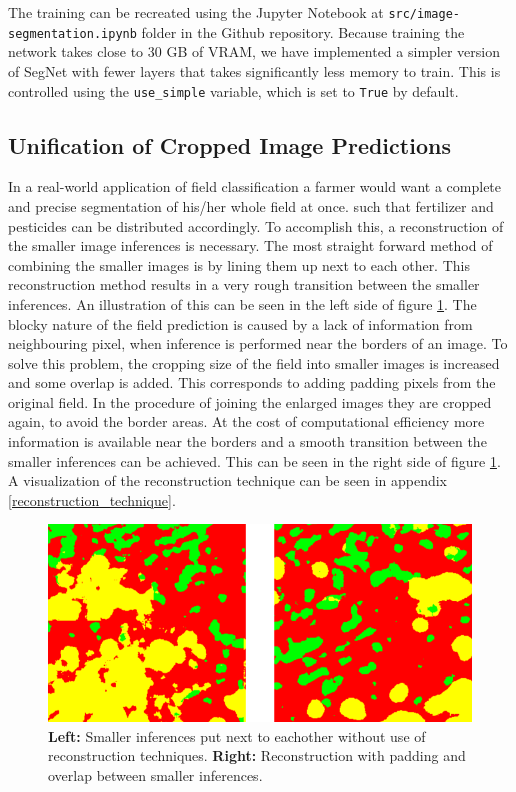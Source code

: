 \documentclass{article}
\begin{document}
The training can be recreated using the Jupyter Notebook at \texttt{src/image-segmentation.ipynb} folder in the Github repository.
Because training the network takes close to 30 GB of VRAM, we have implemented a simpler version of SegNet with fewer layers that takes significantly less memory to train.
This is controlled using the \texttt{use\_simple} variable, which is set to \texttt{True} by default.


\subsection{Unification of Cropped Image Predictions}
In a real-world application of field classification a farmer would want a complete and precise segmentation of his/her whole field at once. such that fertilizer and pesticides can be distributed accordingly. To accomplish this, a reconstruction of the smaller image inferences is necessary. The most straight forward method of combining the smaller images is by lining them up next to each other. This reconstruction method results in a very rough transition between the smaller inferences. An illustration of this can be seen in the left side of figure \ref{fig:earlylatereconstruction}.
The blocky nature of the field prediction is caused by a lack of information from neighbouring pixel, when inference is performed near the borders of an image. 
To solve this problem, the cropping size of the field into smaller images is increased and some overlap is added. This corresponds to adding padding pixels from the original field.
In the procedure of joining the enlarged images they are cropped again, to avoid the border areas. At the cost of computational efficiency more information is available near the borders and a smooth transition between the smaller inferences can be achieved. This can be seen in the right side of figure \ref{fig:earlylatereconstruction}. A visualization of the reconstruction technique can be seen in appendix \ref{reconstruction_technique}.



\begin{figure}[!htb]
	\centering
	\includegraphics[width=0.9\linewidth]{early_late_reconstruction2}
	\caption{\textbf{Left:} Smaller inferences put next to eachother without use of reconstruction techniques. \textbf{Right:} Reconstruction with padding and overlap between smaller inferences.}
	\label{fig:earlylatereconstruction}
\end{figure}
\end{document}
